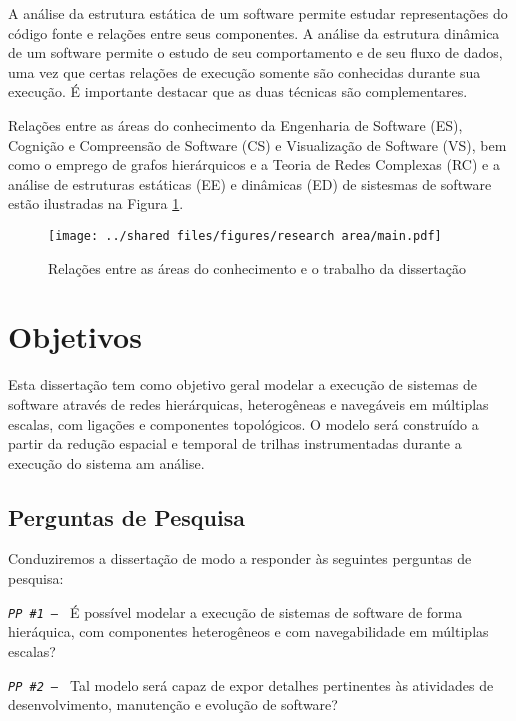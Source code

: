 A análise da estrutura estática de um software permite estudar representações do
código fonte e relações entre seus componentes.
A análise da estrutura dinâmica de um software permite o estudo de seu
comportamento e de seu fluxo de dados, uma vez que certas relações de execução 
somente são conhecidas durante sua execução.
É importante destacar que as duas técnicas são complementares.

Relações entre as áreas do conhecimento da Engenharia de Software (ES), Cognição
e Compreensão de Software (CS) e Visualização de Software (VS), bem como o
emprego de grafos hierárquicos e a Teoria de Redes Complexas (RC) e a análise de
estruturas estáticas (EE) e dinâmicas (ED) de sistesmas de software estão
ilustradas na Figura \ref{fig:RelaçãoConhecimentoTrabalho}.

\begin{figure}[!htb]
    \centering
    \caption{Relações entre as áreas do conhecimento e o trabalho da dissertação}
    \texttt{[image: ../shared files/figures/research area/main.pdf]}
    \label{fig:RelaçãoConhecimentoTrabalho}
\end{figure}

\section{Objetivos}
\label{sec:Objetivos}

Esta dissertação tem como objetivo geral modelar a execução de sistemas de
software através de redes hierárquicas, heterogêneas e navegáveis em múltiplas
escalas, com ligações e componentes topológicos. O modelo será construído a
partir da redução espacial e temporal de trilhas instrumentadas durante a
execução do sistema am análise.

\subsection{Perguntas de Pesquisa}
\label{subsec:PerguntasPesquisa}

Conduziremos a dissertação de modo a responder às seguintes perguntas de
pesquisa:

\noindent
\texttt{\textit{PP \#1 -- }}
É possível modelar a execução de sistemas de software de forma hieráquica, com
componentes heterogêneos e com navegabilidade em múltiplas escalas?

\noindent
\texttt{\textit{PP \#2 -- }}
Tal modelo será capaz de expor detalhes pertinentes às atividades de
desenvolvimento, manutenção e evolução de software?

